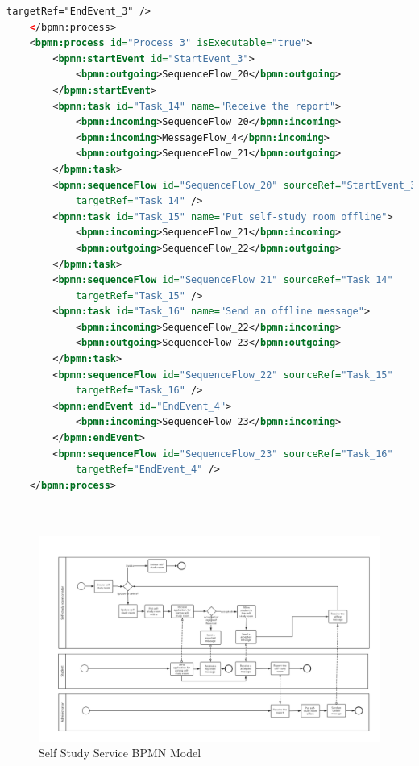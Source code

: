 \documentclass[runningheads]{llncs}
\begin{document}
\begin{lstlisting}[language={XML}]
	        targetRef="EndEvent_3" />
	</bpmn:process>
	<bpmn:process id="Process_3" isExecutable="true">
		<bpmn:startEvent id="StartEvent_3">
	        <bpmn:outgoing>SequenceFlow_20</bpmn:outgoing>
	    </bpmn:startEvent>
		<bpmn:task id="Task_14" name="Receive the report">
	        <bpmn:incoming>SequenceFlow_20</bpmn:incoming>
			<bpmn:incoming>MessageFlow_4</bpmn:incoming>
			<bpmn:outgoing>SequenceFlow_21</bpmn:outgoing>
	    </bpmn:task>
		<bpmn:sequenceFlow id="SequenceFlow_20" sourceRef="StartEvent_3"
	        targetRef="Task_14" />
		<bpmn:task id="Task_15" name="Put self-study room offline">
	        <bpmn:incoming>SequenceFlow_21</bpmn:incoming>
			<bpmn:outgoing>SequenceFlow_22</bpmn:outgoing>
	    </bpmn:task>
		<bpmn:sequenceFlow id="SequenceFlow_21" sourceRef="Task_14"
	        targetRef="Task_15" />
		<bpmn:task id="Task_16" name="Send an offline message">
	        <bpmn:incoming>SequenceFlow_22</bpmn:incoming>
			<bpmn:outgoing>SequenceFlow_23</bpmn:outgoing>
	    </bpmn:task>
		<bpmn:sequenceFlow id="SequenceFlow_22" sourceRef="Task_15"
	        targetRef="Task_16" />
		<bpmn:endEvent id="EndEvent_4">
			<bpmn:incoming>SequenceFlow_23</bpmn:incoming>
		</bpmn:endEvent>
		<bpmn:sequenceFlow id="SequenceFlow_23" sourceRef="Task_16"
	        targetRef="EndEvent_4" />
	</bpmn:process>

    
	\end{lstlisting}
	\begin{figure}
		\centering %
		\includegraphics[width=1.0\textwidth]{figure/llt/bpmnselfstudy} %
		\caption{Self Study Service BPMN Model} %
		\label{bpmnselfstudy} %
	\end{figure}
\end{document}
